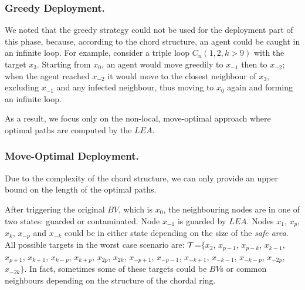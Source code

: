 
\subsubsection{\bf Greedy Deployment.}\label{no-greedy}



We noted that the greedy strategy could not be used for the deployment part of this phase, because, according to the chord structure, an agent could be caught  in an infinite loop. For example,  consider  a triple loop $C_n(1,2,k>9)$ with the target  $x_{3}$. Starting from $x_{0}$, an agent would move greedily to $x_{-1}$ then to $x_{-2}$; when the agent reached $x_{-2}$  it would move to the closest neighbour of  $x_{3}$, excluding $x_{-1}$ and any infected neighbour, thus moving to $x_{0}$ again and forming an infinite loop. 


As a result, we focus only on the non-local, move-optimal approach where optimal paths are computed by the $LEA$.
\subsubsection{\bf Move-Optimal Deployment.}
Due to the complexity of the chord structure, we can only provide an upper bound on the length of the optimal paths.
 
After triggering the original $BV$, which is $x_{0}$,  the neighbouring nodes are in one of two states: guarded or contaminated.
Node $x_{-1}$ is  guarded by $LEA$. Nodes $x_{1}$, $x_{p}$, $x_{k}$, $x_{-p}$ and $x_{-k}$ could be in either state depending on the size of the {\it safe area}.
All possible targets in the worst case scenario are: ${\cal T}$=$\{x_{2}$, $x_{p-1}$, $x_{p-k}$, $x_{k-1}$, $x_{p+1}$, $x_{k+1}$, $x_{k-p}$, $x_{k+p}$, $x_{2p}$, $x_{2k}$, $x_{-p+1}$, $x_{-p-1}$, $x_{-k+1}$, $x_{-k-1}$, $x_{-k-p}$, $x_{-2p}$, $x_{-2k}\}$. In fact, sometimes some of these targets could be $BV$s or common neighbours depending on the structure of the chordal ring. 



